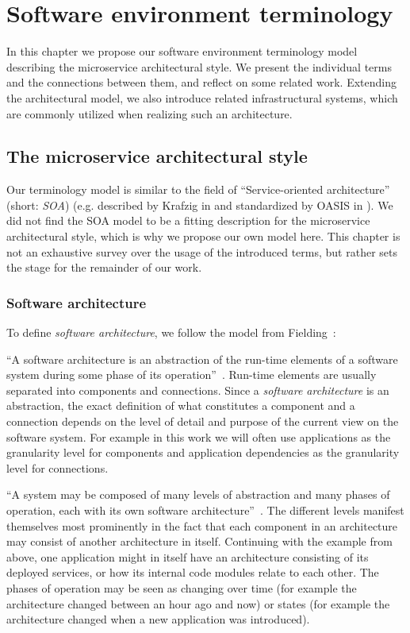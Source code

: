 
\section{Software environment terminology}
\label{sec:software_environment_terminology}

In this chapter we propose our software environment terminology model describing the microservice architectural style. We present the individual terms and the connections between them, and reflect on some related work. Extending the architectural model, we also introduce related infrastructural systems, which are commonly utilized when realizing such an architecture.

\subsection{The microservice architectural style}

Our terminology model is similar to the field of ``Service-oriented architecture'' (short: \emph{SOA}) (e.g. described by Krafzig in \cite{enterpriseSOA} and standardized by OASIS in \cite{oasissoa}). We did not find the SOA model to be a fitting description for the microservice architectural style, which is why we propose our own model here. This chapter is not an exhaustive survey over the usage of the introduced terms, but rather sets the stage for the remainder of our work.

\subsubsection{Software architecture}

To define \emph{software architecture}, we follow the model from Fielding~\cite{Fielding}:

``A software architecture is an abstraction of the run-time elements of a software system during some phase of its operation''~\cite{Fielding}. Run-time elements are usually separated into components and connections. Since a \emph{software architecture} is an abstraction, the exact definition of what constitutes a component and a connection depends on the level of detail and purpose of the current view on the software system. For example in this work we will often use applications as the granularity level for components and application dependencies as the granularity level for connections.

``A system may be composed of many levels of abstraction and many phases of operation, each with its own software architecture''~\cite{Fielding}. The different levels manifest themselves most prominently in the fact that each component in an architecture may consist of another architecture in itself. Continuing with the example from above, one application might in itself have an architecture consisting of its deployed services, or how its internal code modules relate to each other. The phases of operation may be seen as changing over time (for example the architecture changed between an hour ago and now) or states (for example the architecture changed when a new application was introduced).

